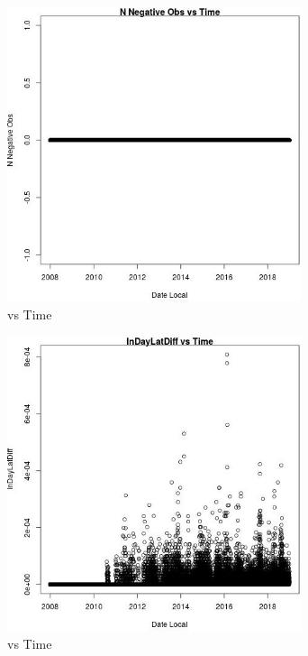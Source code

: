 \begin{figure} 
\centering  
\includegraphics[width=0.77\textwidth]{Code_Outputs/Report_PM25_Step4_part_e_de_duplicated_aves_ML_input_N_Negative_ObsvDate_Local.jpg} 
\caption{\label{fig:Report_PM25_Step4_part_e_de_duplicated_aves_ML_inputN_Negative_ObsvDate_Local}vs Time} 
\end{figure} 
 

\clearpage 

\begin{figure} 
\centering  
\includegraphics[width=0.77\textwidth]{Code_Outputs/Report_PM25_Step4_part_e_de_duplicated_aves_ML_input_InDayLatDiffvDate_Local.jpg} 
\caption{\label{fig:Report_PM25_Step4_part_e_de_duplicated_aves_ML_inputInDayLatDiffvDate_Local}vs Time} 
\end{figure} 
 

